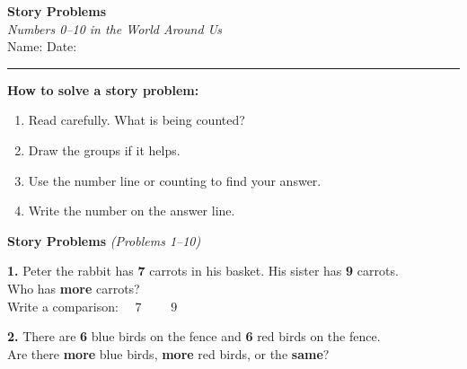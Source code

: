 \documentclass[12pt, letterpaper]{article}
\newcommand{\answerline}{\underline{\hspace{2.5cm}}}
\newcommand{\biganswerline}{\underline{\hspace{4cm}}}
\newcommand{\symbox}{\fbox{\hspace{0.7cm}}}
\begin{document}
\begin{center}
  {\LARGE\textbf{\textcolor{scholared}{Story Problems}}}\\[4pt]
  {\Large\textcolor{scholagold}{\textit{Numbers 0–10 in the World Around Us}}}\\[6pt]
  {\small Name: \biganswerline \hspace{1cm} Date: \answerline}
\end{center}

\vspace{4pt}
\noindent\textcolor{scholared}{\rule{\linewidth}{1pt}}
\vspace{4pt}


\begin{lessonbox}
\textbf{How to solve a story problem:}
\begin{enumerate}[leftmargin=2em, itemsep=2pt]
  \item Read carefully. What is being counted?
  \item Draw the groups if it helps.
  \item Use the number line or counting to find your answer.
  \item Write the number on the answer line.
\end{enumerate}
\end{lessonbox}

\bigskip

\noindent\textcolor{scholared}{\large\textbf{Story Problems}} \hfill \textit{(Problems 1–10)}

\bigskip

\begin{storybox}
\textbf{1.} Peter the rabbit has \textbf{7} carrots in his basket. His sister has \textbf{9} carrots.\\
Who has \textbf{more} carrots? \hfill \answerline\\[4pt]
Write a comparison: $\quad 7 \quad$ \symbox $\quad 9$
\end{storybox}

\bigskip

\begin{storybox}
\textbf{2.} There are \textbf{6} blue birds on the fence and \textbf{6} red birds on the fence.\\
Are there \textbf{more} blue birds, \textbf{more} red birds, or the \textbf{same}? \hfill \answerline
\end{storybox}
\end{document}
